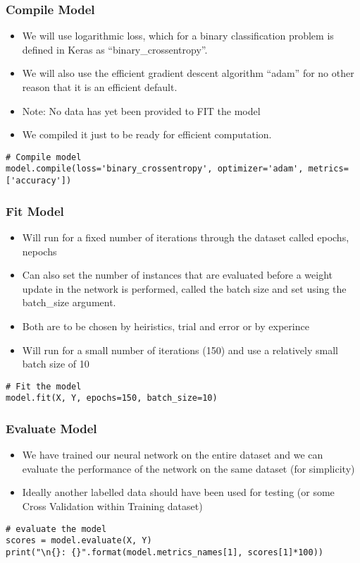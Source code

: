 \begin{frame}[fragile] \frametitle{Compile Model}
 \begin{itemize}
\item We will use logarithmic loss, which for a binary classification problem is defined in Keras as ``binary\_crossentropy''. 
\item We will also use the efficient gradient descent algorithm ``adam'' for no other reason that it is an efficient default. 
\item Note: No data has yet been provided to FIT the model
\item We compiled it just to be ready for efficient computation.
\end{itemize}
\begin{lstlisting}
# Compile model
model.compile(loss='binary_crossentropy', optimizer='adam', metrics=['accuracy'])
\end{lstlisting}
\end{frame}

\begin{frame}[fragile] \frametitle{Fit Model}
 \begin{itemize}
\item Will run for a fixed number of iterations through the dataset called epochs, nepochs
\item Can also set the number of instances that are evaluated before a weight update in the network is performed, called the batch size and set using the batch\_size argument.
\item Both are to be chosen by heiristics, trial and error or by experince
\item Will run for a small number of iterations (150) and use a relatively small batch size of 10
\end{itemize}
\begin{lstlisting}
# Fit the model
model.fit(X, Y, epochs=150, batch_size=10)
\end{lstlisting}
\end{frame}


\begin{frame}[fragile] \frametitle{Evaluate Model}
 \begin{itemize}
\item We have trained our neural network on the entire dataset and we can evaluate the performance of the network on the same dataset (for simplicity)
\item Ideally another labelled data should have been used for testing (or some Cross Validation within Training dataset)
\end{itemize}
\begin{lstlisting}
# evaluate the model
scores = model.evaluate(X, Y)
print("\n{}: {}".format(model.metrics_names[1], scores[1]*100))
\end{lstlisting}
\end{frame}

